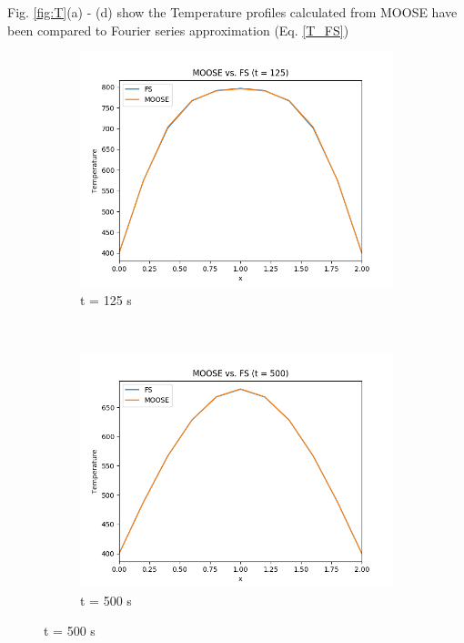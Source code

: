 \documentclass[12pt]{article}
\begin{document}
Fig. \ref{fig:T}(a) - (d) show the Temperature profiles calculated from MOOSE have been compared to Fourier series approximation (Eq. \ref{T_FS}) 
\begin{figure}[h]
    \centering
    \begin{subfigure}[b]{0.4\textwidth}
        \includegraphics[width=\textwidth]{t125.png}
        \caption{t = 125 s}
        \label{fig:t125}
    \end{subfigure}
    ~ %
    \begin{subfigure}[b]{0.4\textwidth}
        \includegraphics[width=\textwidth]{t500.png}
        \caption{t = 500 s}
        \label{fig:tiger}
    \end{subfigure}
    

\end{figure}
\end{document}
